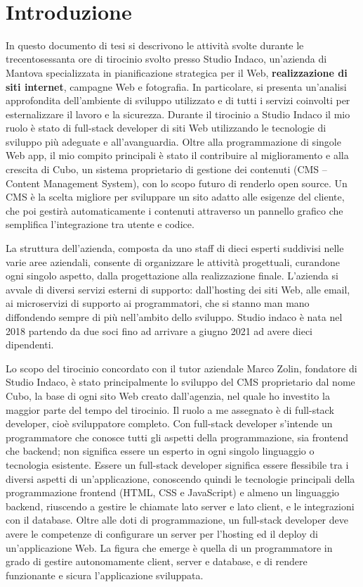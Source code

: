 \documentclass[12pt,a4paper]{article}
\begin{document}
\clearpage
\clearpage
\tableofcontents{}
\clearpage

\newpage
\
\newpage

\section{Introduzione}
In questo documento di tesi si descrivono le attività svolte durante le trecentosessanta ore di tirocinio svolto presso Studio Indaco, un'azienda di Mantova specializzata in pianificazione strategica per il Web, \textbf{realizzazione di siti internet}, campagne Web e fotografia.
In particolare, si presenta un’analisi approfondita dell'ambiente di sviluppo utilizzato e di tutti i servizi coinvolti per esternalizzare il lavoro e la sicurezza.
Durante il tirocinio a Studio Indaco il mio ruolo è stato di full-stack developer di siti Web utilizzando le tecnologie di sviluppo più adeguate e all’avanguardia.
Oltre alla programmazione di singole Web app, il mio compito principali è stato il contribuire al miglioramento e alla crescita di Cubo, un sistema proprietario di gestione dei contenuti (CMS – Content Management System), con lo scopo futuro di renderlo open source. Un CMS è la scelta migliore per sviluppare un sito adatto alle esigenze del cliente, che poi gestirà automaticamente i contenuti attraverso un pannello grafico che semplifica l'integrazione tra utente e codice.

La struttura dell'azienda, composta da uno staff di dieci esperti suddivisi nelle varie aree aziendali, consente di organizzare le attività progettuali, curandone ogni singolo aspetto, dalla progettazione alla realizzazione finale.
L’azienda si avvale di diversi servizi esterni di supporto: dall’hosting dei siti Web, alle email, ai microservizi di supporto ai programmatori, che si stanno man mano diffondendo sempre di più nell’ambito dello sviluppo.
Studio indaco è nata nel 2018 partendo da due soci fino ad arrivare a giugno 2021 ad avere dieci dipendenti.

Lo scopo del tirocinio concordato con il tutor aziendale Marco Zolin, fondatore di Studio Indaco, è stato principalmente lo sviluppo del CMS proprietario dal nome Cubo, la base di ogni sito Web creato dall’agenzia, nel  quale ho investito la maggior parte del tempo del tirocinio.
Il ruolo a me assegnato è di full-stack developer, cioè sviluppatore completo. Con full-stack developer s'intende un programmatore che conosce tutti gli aspetti della programmazione, sia frontend che backend; non significa essere un esperto in ogni singolo linguaggio o tecnologia esistente. Essere un full-stack developer significa essere flessibile tra i diversi aspetti di un’applicazione, conoscendo quindi le tecnologie principali della programmazione frontend (HTML, CSS e JavaScript) e almeno un linguaggio backend, riuscendo a gestire le chiamate lato server e lato client, e le integrazioni con il database.
Oltre alle doti di programmazione, un full-stack developer deve avere le competenze di configurare un server per l'hosting ed il deploy di un'applicazione Web.
La figura che emerge è quella di un programmatore in grado di gestire autonomamente client, server e database, e di rendere funzionante e sicura l'applicazione sviluppata.
\end{document}
